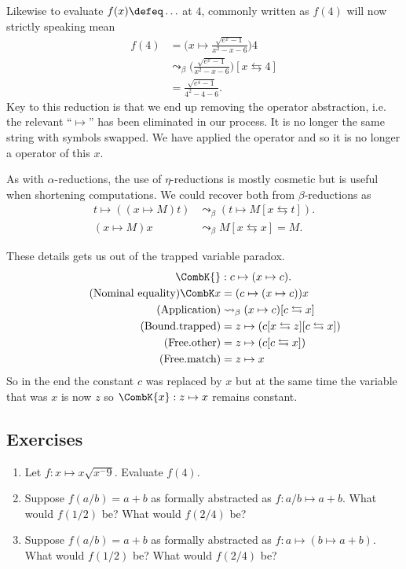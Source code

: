 Likewise to evaluate $f(x)\defeq \ldots$ at $4$, commonly written as $f(4)$ will 
now strictly speaking mean
\begin{align*}
    f(4) & = \biggl(x\mapsto \frac{\sqrt{e^x-1}}{x^2-x-6}\biggr)4 \\
     & \leadsto_{\beta} \biggl(\frac{\sqrt{e^x-1}}{x^2-x-6}\biggr)[x\leftrightarrows 4]\\
    & =\frac{\sqrt{e^4-1}}{4^2-4-6}.
\end{align*}
Key to this reduction is that we end up removing the operator abstraction, i.e.
the relevant ``$\mapsto$'' has been eliminated in our process.  It is no longer
the same string with symbols swapped.  We have applied the operator and so it 
is no longer a operator of this $x$.

As with $\alpha$-reductions, the use of $\eta$-reductions is mostly cosmetic 
but is useful when shortening computations.  We could recover both from
$\beta$-reductions as 
\begin{align*}
    t\mapsto ((x\mapsto M)t) & \leadsto_{\beta} (t\mapsto M[x\leftrightarrows t]).\\
    (x\mapsto M)x & \leadsto_{\beta} M[x\leftrightarrows x]=M.
\end{align*}


These details
gets us out of the trapped variable paradox.
\begin{align*}
    \CombK{} &: c  \mapsto (x\mapsto c).\\
    \tag{Nominal equality}
    \CombK x & = (c\mapsto (x\mapsto c))x\\
    \tag{Application}
        & \leadsto_{\beta} (x\mapsto c)[c\leftrightarrows x]\\
    \tag{Bound.trapped}
        & = z\mapsto (c[x\leftrightarrows z][c\leftrightarrows x])\\
    \tag{Free.other}
        & = z\mapsto (c[c\leftrightarrows x])\\
    \tag{Free.match}
        & = z\mapsto x
\end{align*}
So in the end the constant $c$ was replaced by $x$ but at the same time 
the variable that was $x$ is now $z$ so $\CombK{x}:z\mapsto x$ remains constant.


\subsection{Exercises}
\begin{enumerate}
    \item Let $f:x\mapsto x\sqrt{x^-9}$.  Evaluate $f(4)$.

    \item Suppose $f(a/b)=a+b$ as formally abstracted as $f:a/b\mapsto a+b$.  What would $f(1/2)$ be?
    What would $f(2/4)$ be? 

    \item Suppose $f(a/b)=a+b$ as formally abstracted as $f:a\mapsto (b\mapsto a+b)$.  What would $f(1/2)$ be?
    What would $f(2/4)$ be?  

\end{enumerate}